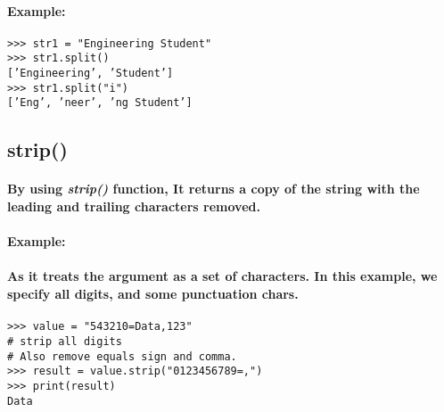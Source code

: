 \documentclass{book}
\begin{document}
\paragraph{Example:}

\begin{verbatim}
>>> str1 = "Engineering Student"
>>> str1.split()
[’Engineering’, ’Student’]
>>> str1.split("i")
[’Eng’, ’neer’, ’ng Student’]
\end{verbatim}

\subsection*{strip()}

\paragraph{By using \textit{strip()} function, It returns a copy of the string with the leading and trailing characters removed.}

\paragraph{Example:}

\paragraph{As it treats the argument as a set of characters. In this example, we specify all digits, and some punctuation chars.}

\begin{verbatim}
>>> value = "543210=Data,123"
# strip all digits
# Also remove equals sign and comma.
>>> result = value.strip("0123456789=,")
>>> print(result)
Data
\end{verbatim}
\end{document}
